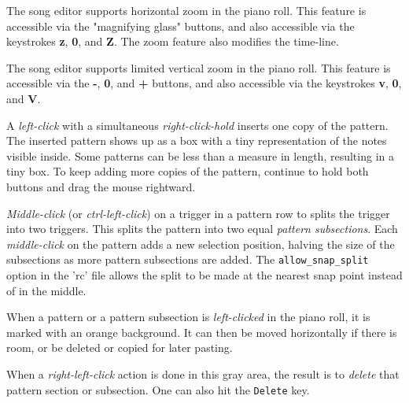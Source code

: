   The song editor supports horizontal zoom in the piano roll.
   This feature is accessible via the "magnifying glass" buttons, and also
   accessible via the keystrokes \textbf{z}, \textbf{0}, and \textbf{Z}.
   The zoom feature also modifies the time-line.

   The song editor supports limited vertical zoom in the piano roll.
   This feature is accessible via the \textbf{-}, \textbf{0}, and
   \textbf{+} buttons, and also
   accessible via the keystrokes \textbf{v}, \textbf{0}, and \textbf{V}.

   A \textsl{left-click} with a simultaneous
   \textsl{right-click-hold} inserts one copy of the
   pattern.  The inserted pattern shows up as a box with a tiny
   representation of the notes visible inside.  Some patterns can
   be less than a measure in length, resulting in a tiny box.
   To keep adding more copies of the pattern, continue to hold both buttons
   and drag the mouse rightward.

   \textsl{Middle-click} (or \textsl{ctrl-left-click})
   on a trigger in a pattern row
   to splits the trigger into two triggers.
   This splits the pattern into two equal \textsl{pattern subsections}.
   Each \textsl{middle-click} on the pattern adds a new selection position,
   halving the size of the subsections as more pattern subsections are
   added.  The \texttt{allow\_snap\_split} option in the 'rc' file
   allows the split to be made at the nearest snap point instead of in the
   middle.

   When a pattern or a pattern subsection is
   \textsl{left-clicked} in the piano
   roll, it is marked with an orange background.
   It can then be moved horizontally if there is room, or be deleted or copied
   for later pasting.

   When a 
   \textsl{right-left-click} action is done in this gray area, the result
   is to \textsl{delete} that pattern section or subsection.
   One can also hit the \texttt{Delete} key.

